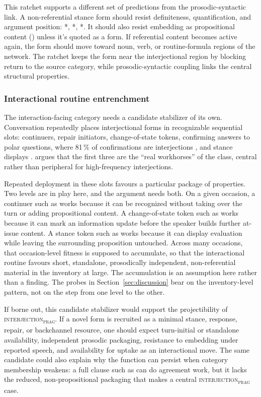 \documentclass[12pt]{article}
\newcommand{\intj}[1]{\textsc{interjection\textsubscript{#1}}}
\begin{document}
This ratchet supports a different set of predictions from the
prosodic-syntactic link. A non-referential stance form should resist
definiteness, quantification, and argument position:
*, *, *. It should also resist embedding as propositional content
() unless it's quoted as a form. If
referential content becomes active again, the form should move toward
noun, verb, or routine-formula regions of the network. The ratchet
keeps the form near the interjectional region by blocking return
to the source category, while prosodic-syntactic coupling links the
central structural properties.

\subsubsection{Interactional routine entrenchment}

The interaction-facing category needs a candidate stabilizer of its own.
Conversation repeatedly places interjectional forms in recognizable
sequential slots: continuers, repair initiators, change-of-state tokens,
confirming answers to polar questions, where 81\,\% of confirmations are
interjections \citep[195]{stivers2019}, and stance displays
\citep[189--190]{dingemanse2020}. \textcite[257--258]{dingemanse2024}
argues that the first three are the \enquote{real workhorses} of the class,
central rather than peripheral for high-frequency interjections.

Repeated deployment in these slots favours a particular package of
properties. Two levels are in play here, and the argument needs both. On a
given occasion, a continuer such as  works because it can be
recognized without taking over the turn or adding propositional content.
A change-of-state token such as  works because it can mark
an information update before the speaker builds further at-issue
content. A stance token such as  works because it can
display evaluation while leaving the surrounding proposition untouched.
Across many occasions, that occasion-level fitness is supposed to accumulate,
so that the interactional routine favours short, standalone, prosodically
independent, non-referential material in the inventory at large. The
accumulation is an assumption here rather than a finding. The probes in
Section~\ref{sec:discussion} bear on the inventory-level pattern, not on the
step from one level to the other.

If borne out, this candidate stabilizer would support the projectibility of
\intj{prag}. If a novel form is recruited as a
minimal stance, response, repair, or backchannel resource, one should
expect turn-initial or standalone availability, independent prosodic
packaging, resistance to embedding under reported speech, and
availability for uptake as an interactional move. The same candidate
could also explain why the function can persist when category membership
weakens: a full clause such as  can do agreement work,
but it lacks the reduced, non-propositional packaging that makes
 a central \intj{prag} case.
\end{document}
